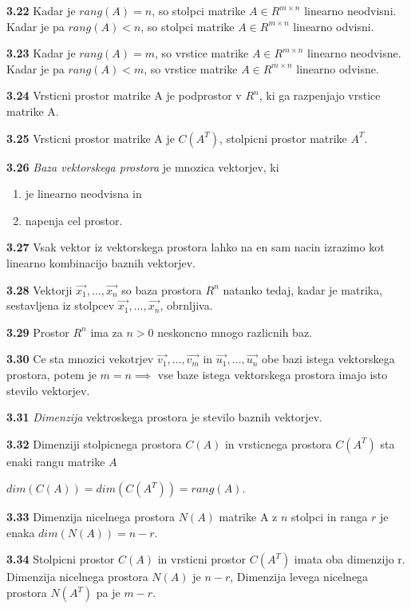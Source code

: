 \documentclass{article}
\begin{document}
\begin{multicols}{2}
	\textbf{3.22} Kadar je $rang(A) = n$, so stolpci matrike $A \in R^{m \times n}$ linearno
	neodvisni. Kadar je pa $rang(A) < n$, so stolpci matrike $A \in R^{m \times n}$ linearno odvisni.

	\textbf{3.23} Kadar je $rang(A) = m$, so vrstice matrike $A \in R^{m \times n}$ linearno neodvisne.
	Kadar je pa $rang(A) < m$, so vrstice matrike $A \in R^{m \times n}$ linearno odvisne.

	\textbf{3.24} Vrsticni prostor matrike A je podprostor v $R^{n}$, ki ga razpenjajo vrstice matrike A.

	\textbf{3.25} Vrsticni prostor matrike A je $C(A^{T})$, stolpicni prostor matrike $A^{T}$.

	\textbf{3.26} \textit{Baza vektorskega prostora} je mnozica vektorjev, ki
	\begin{enumerate}
		\item je linearno neodvisna in
		\item napenja cel prostor.
	\end{enumerate}

	\textbf{3.27} Vsak vektor iz vektorskega prostora lahko na en sam nacin izrazimo
	kot linearno kombinacijo baznih vektorjev.

	\textbf{3.28} Vektorji $\vec{x_{1}}, \dots,\vec{x_{n}}$ so baza prostora $R^{n}$ natanko tedaj, kadar
	je matrika, sestavljena iz stolpcev $\vec{x_{1}}, \dots,\vec{x_{n}}$, obrnljiva.

	\textbf{3.29} Prostor $R^{n}$ ima za $n > 0$ neskoncno mnogo razlicnih baz.

	\textbf{3.30} Ce sta mnozici vekotrjev {$\vec{v_{1}}, \dots,\vec{v_{m}}$} in $\vec{u_{1}}, \dots,\vec{u_{n}}$
	obe bazi istega vektorskega prostora, potem je $m = n \implies$ vse baze istega vektorskega prostora imajo
	isto stevilo vektorjev.

	\textbf{3.31} \textit{Dimenzija} vektroskega prostora je stevilo baznih vektorjev.

	\textbf{3.32} Dimenziji stolpicnega prostora $C(A)$ in vrsticnega prostora $C(A^{T})$ sta enaki rangu matrike $A$
	\begin{center}
		$dim(C(A)) = dim(C(A^{T})) = rang(A)$.
	\end{center}

	\textbf{3.33} Dimenzija nicelnega prostora $N(A)$ matrike A z $n$ stolpci in ranga $r$
	je enaka $dim(N(A)) = n - r$.

	\textbf{3.34} Stolpicni prostor $C(A)$ in vrsticni prostor $C(A^{T})$ imata oba dimenzijo r. Dimenzija
	nicelnega prostora $N(A)$ je $n -r$, Dimenzija levega nicelnega prostora $N(A^{T})$ pa je $m - r$.


\end{multicols}
\end{document}
